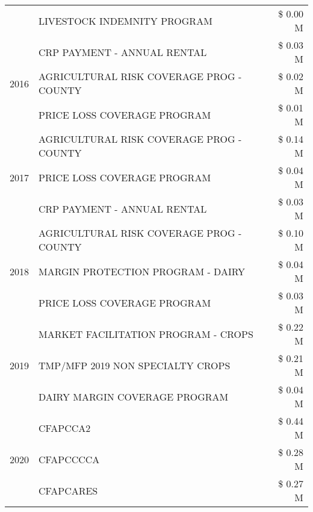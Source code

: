 \begin{tabular}{llr}
 & LIVESTOCK INDEMNITY PROGRAM & \$ 0.00 M \\
\cline{1-3}
\multirow[t]{3}{*}{2016} & CRP PAYMENT - ANNUAL RENTAL & \$ 0.03 M \\
 & AGRICULTURAL RISK COVERAGE PROG - COUNTY & \$ 0.02 M \\
 & PRICE LOSS COVERAGE PROGRAM & \$ 0.01 M \\
\cline{1-3}
\multirow[t]{3}{*}{2017} & AGRICULTURAL RISK COVERAGE PROG - COUNTY & \$ 0.14 M \\
 & PRICE LOSS COVERAGE PROGRAM & \$ 0.04 M \\
 & CRP PAYMENT - ANNUAL RENTAL & \$ 0.03 M \\
\cline{1-3}
\multirow[t]{3}{*}{2018} & AGRICULTURAL RISK COVERAGE PROG - COUNTY & \$ 0.10 M \\
 & MARGIN PROTECTION PROGRAM - DAIRY & \$ 0.04 M \\
 & PRICE LOSS COVERAGE PROGRAM & \$ 0.03 M \\
\cline{1-3}
\multirow[t]{3}{*}{2019} & MARKET FACILITATION PROGRAM - CROPS & \$ 0.22 M \\
 & TMP/MFP 2019 NON SPECIALTY CROPS & \$ 0.21 M \\
 & DAIRY MARGIN COVERAGE PROGRAM & \$ 0.04 M \\
\cline{1-3}
\multirow[t]{3}{*}{2020} & CFAPCCA2 & \$ 0.44 M \\
 & CFAPCCCCA & \$ 0.28 M \\
 & CFAPCARES & \$ 0.27 M \\
\cline{1-3}
\bottomrule
\end{tabular}
